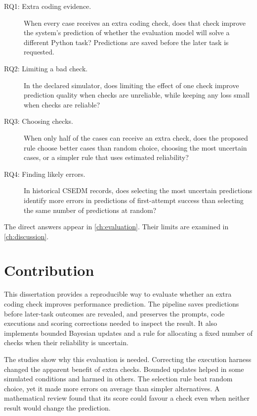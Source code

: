 \begin{description}
  \item[RQ1: Extra coding evidence.] When every case receives an extra coding check, does that check improve the system's
  prediction of whether the evaluation model will solve a different Python task? Predictions are saved before the later task
  is requested.
  \item[RQ2: Limiting a bad check.] In the declared simulator, does limiting the effect of one check improve prediction quality
  when checks are unreliable, while keeping any loss small when checks are reliable?
  \item[RQ3: Choosing checks.] When only half of the cases can receive an extra check, does the proposed rule choose better cases
  than random choice, choosing the most uncertain cases, or a simpler rule that uses estimated reliability?
  \item[RQ4: Finding likely errors.] In historical CSEDM records, does selecting the most uncertain predictions identify more
  errors in predictions of first-attempt success than selecting the same number of predictions at random?
\end{description}

The direct answers appear in \cref{ch:evaluation}. Their limits are examined in \cref{ch:discussion}.

\suppressfloats[t]
\section{Contribution}

This dissertation provides a reproducible way to evaluate whether an extra coding check improves performance prediction.
The pipeline saves predictions before later-task outcomes are revealed, and preserves the prompts, code executions and scoring
corrections needed to inspect the result. It also implements bounded Bayesian updates and a rule for allocating a fixed number
of checks when their reliability is uncertain.

The studies show why this evaluation is needed. Correcting the execution harness changed the apparent benefit of extra checks.
Bounded updates helped in some simulated conditions and harmed in others. The selection rule beat random choice, yet it made
more errors on average than simpler alternatives. A mathematical review found that its score could favour a check even when
neither result would change the prediction.

